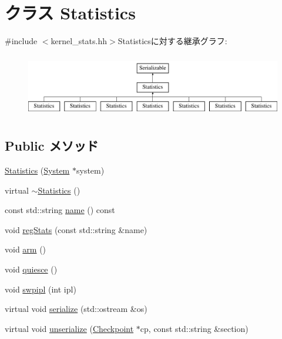 \hypertarget{classKernel_1_1Statistics}{
\section{クラス Statistics}
\label{classKernel_1_1Statistics}
}


{\ttfamily \#include $<$kernel\_\-stats.hh$>$}Statisticsに対する継承グラフ:\begin{figure}[H]
\begin{center}
\leavevmode
\includegraphics[height=2.7907cm]{classKernel_1_1Statistics}
\end{center}
\end{figure}
\subsection*{Public メソッド}
\begin{DoxyCompactItemize}
\item 
\hyperlink{classKernel_1_1Statistics_a83aac6d65afe578fbf92b926ce7c1c3c}{Statistics} (\hyperlink{classSystem}{System} $\ast$system)
\item 
virtual \hyperlink{classKernel_1_1Statistics_a1a489571e06ba279eb0653734ba026c5}{$\sim$Statistics} ()
\item 
const std::string \hyperlink{classKernel_1_1Statistics_a6490f765a824ced1cc94979609fe7e07}{name} () const 
\item 
void \hyperlink{classKernel_1_1Statistics_a3dd3443357312bcb75580eaa508c48a4}{regStats} (const std::string \&name)
\item 
void \hyperlink{classKernel_1_1Statistics_a03d5bebb6b9658c96966bad93b776195}{arm} ()
\item 
void \hyperlink{classKernel_1_1Statistics_aabe90b7041b94c26647a5e08f194718b}{quiesce} ()
\item 
void \hyperlink{classKernel_1_1Statistics_afb2ab1d7d1dbe5044402867ab17401dc}{swpipl} (int ipl)
\item 
virtual void \hyperlink{classKernel_1_1Statistics_ad6272f80ae37e8331e3969b3f072a801}{serialize} (std::ostream \&os)
\item 
virtual void \hyperlink{classKernel_1_1Statistics_af100c4e9feabf3cd918619c88c718387}{unserialize} (\hyperlink{classCheckpoint}{Checkpoint} $\ast$cp, const std::string \&section)
\end{DoxyCompactItemize}
